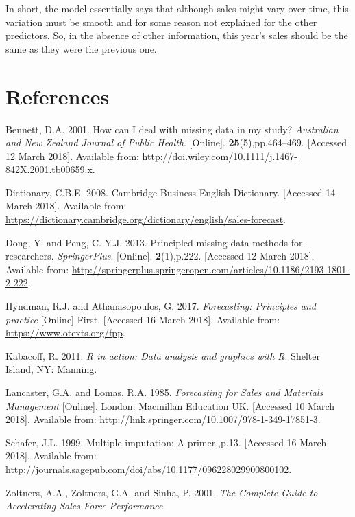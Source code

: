 \documentclass[11pt,]{article}
\begin{document}
In short, the model essentially says that although sales might vary over
time, this variation must be smooth and for some reason not explained
for the other predictors. So, in the absence of other information, this
year's sales should be the same as they were the previous one.

\section*{References}\label{references}

\hypertarget{refs}{}
\hypertarget{ref-bennett_how_2001}{}
Bennett, D.A. 2001. How can I deal with missing data in my study?
\emph{Australian and New Zealand Journal of Public Health}.
{[}Online{]}. \textbf{25}(5),pp.464--469. {[}Accessed 12 March 2018{]}.
Available from:
\url{http://doi.wiley.com/10.1111/j.1467-842X.2001.tb00659.x}.

\hypertarget{ref-cambridge_business_english_dictionary_cambridge_2008}{}
Dictionary, C.B.E. 2008. Cambridge Business English Dictionary.
{[}Accessed 14 March 2018{]}. Available from:
\url{https://dictionary.cambridge.org/dictionary/english/sales-forecast}.

\hypertarget{ref-dong_principled_2013}{}
Dong, Y. and Peng, C.-Y.J. 2013. Principled missing data methods for
researchers. \emph{SpringerPlus}. {[}Online{]}. \textbf{2}(1),p.222.
{[}Accessed 12 March 2018{]}. Available from:
\url{http://springerplus.springeropen.com/articles/10.1186/2193-1801-2-222}.

\hypertarget{ref-hyndman_forecasting:_2017}{}
Hyndman, R.J. and Athana­sopou­los, G. 2017. \emph{Forecasting:
Principles and practice} {[}Online{]} First. {[}Accessed 16 March
2018{]}. Available from: \url{https://www.otexts.org/fpp}.

\hypertarget{ref-kabacoff_r_2011}{}
Kabacoff, R. 2011. \emph{R in action: Data analysis and graphics with
R}. Shelter Island, NY: Manning.

\hypertarget{ref-lancaster_forecasting_1985}{}
Lancaster, G.A. and Lomas, R.A. 1985. \emph{Forecasting for Sales and
Materials Management} {[}Online{]}. London: Macmillan Education UK.
{[}Accessed 10 March 2018{]}. Available from:
\url{http://link.springer.com/10.1007/978-1-349-17851-3}.

\hypertarget{ref-schafer_multiple_1999}{}
Schafer, J.L. 1999. Multiple imputation: A primer.,p.13. {[}Accessed 16
March 2018{]}. Available from:
\url{http://journals.sagepub.com/doi/abs/10.1177/096228029900800102}.

\hypertarget{ref-zoltners_complete_2001}{}
Zoltners, A.A., Zoltners, G.A. and Sinha, P. 2001. \emph{The Complete
Guide to Accelerating Sales Force Performance}.
\end{document}
